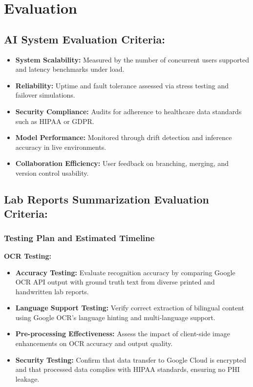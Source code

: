 \documentclass[a4paper, 12pt]{article}
\begin{document}
\section{Evaluation}

\subsection{AI System Evaluation Criteria:}
\begin{itemize}
    \item \textbf{System Scalability:} Measured by the number of concurrent users supported and latency benchmarks under load.
    \item \textbf{Reliability:} Uptime and fault tolerance assessed via stress testing and failover simulations.
    \item \textbf{Security Compliance:} Audits for adherence to healthcare data standards such as HIPAA or GDPR.
    \item \textbf{Model Performance:} Monitored through drift detection and inference accuracy in live environments.
    \item \textbf{Collaboration Efficiency:} User feedback on branching, merging, and version control usability.
\end{itemize}


\subsection{Lab Reports Summarization Evaluation Criteria:}
\subsubsection{Testing Plan and Estimated Timeline}

\textbf{OCR Testing:}
\begin{itemize}
\item \textbf{Accuracy Testing:} Evaluate recognition accuracy by comparing Google OCR API output with ground truth text from diverse printed and handwritten lab reports.
\item \textbf{Language Support Testing:} Verify correct extraction of bilingual content using Google OCR’s language hinting and multi-language support.
\item \textbf{Pre-processing Effectiveness:} Assess the impact of client-side image enhancements on OCR accuracy and output quality.
\item \textbf{Security Testing:} Confirm that data transfer to Google Cloud is encrypted and that processed data complies with HIPAA standards, ensuring no PHI leakage.
\end{itemize}
\end{document}
